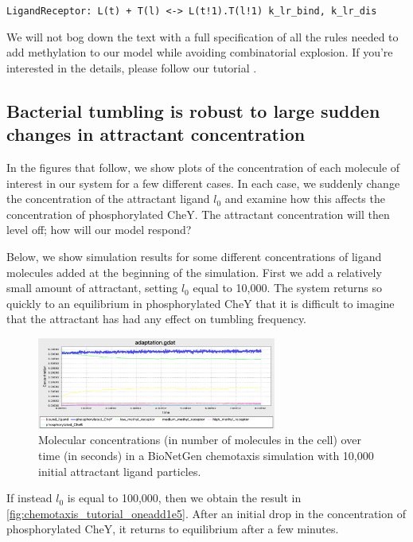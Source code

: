\texttt{LigandReceptor: L(t) + T(l) <-> L(t!1).T(l!1) k\_lr\_bind, k\_lr\_dis}

We will not bog down the text with a full specification of all the rules needed to add methylation to our model while avoiding combinatorial explosion. If you're interested in the details, please follow our tutorial .


\FloatBarrier
{}
\subsection{Bacterial tumbling is robust to large sudden changes in attractant concentration}

In the figures that follow, we show plots of the concentration of each molecule of interest in our system for a few different cases. In each case, we suddenly change the concentration of the attractant ligand $l_0$ and examine how this affects the concentration of phosphorylated CheY. The attractant concentration will then level off; how will our model respond?

Below, we show simulation results for some different concentrations of ligand molecules added at the beginning of the simulation. First we add a relatively small amount of attractant, setting $l_0$ equal to 10,000. The system returns so quickly to an equilibrium in phosphorylated CheY that it is difficult to imagine that the attractant has had any effect on tumbling frequency.

\begin{figure}[h]
\centering
\mySfFamily
\includegraphics[width = 0.7\textwidth]{../images/chemotaxis_tutorial_oneadd1e4.png}
\caption{Molecular concentrations (in number of molecules in the cell) over time (in seconds) in a BioNetGen chemotaxis simulation with 10,000 initial attractant ligand particles.}
\label{fig:chemotaxis_tutorial_oneadd1e4}
\end{figure}


If instead $l_0$ is equal to 100,000, then we obtain the result in \autoref{fig:chemotaxis_tutorial_oneadd1e5}. After an initial drop in the concentration of phosphorylated CheY, it returns to equilibrium after a few minutes.


